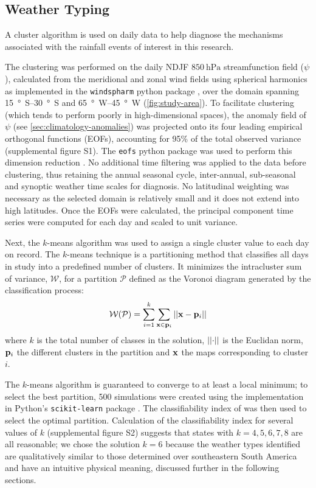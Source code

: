 \documentclass[twocol]{ametsoc}
\begin{document}
\subsection{Weather Typing}

A cluster algorithm is used on daily data to help diagnose the mechanisms associated with the rainfall events of interest in this research.

The clustering was performed on the daily NDJF $\SI{850}{\hecto\pascal}$ streamfunction field ($\psi$), calculated from the meridional and zonal wind fields using spherical harmonics as implemented in the \texttt{windspharm} python package \citep{Dawson:2016ws}, over the domain spanning \SIrange{15}{30}{\degree S} and \SIrange{65}{45}{\degree W} (\cref{fig:study-area}).
To facilitate clustering (which tends to perform poorly in high-dimensional spaces), the anomaly field of $\psi$ (see \cref{sec:climatology-anomalies}) was projected  onto its four leading empirical orthogonal functions (EOFs), accounting for 95\% of the total observed variance (supplemental figure S1).
The \texttt{eofs} python package was used to perform this dimension reduction \citep{Dawson:2016ge}.
No additional time filtering was applied to the data before clustering, thus retaining the annual seasonal cycle, inter-annual, sub-seasonal and synoptic weather time scales for diagnosis.
No latitudinal weighting was necessary as the selected domain is relatively small and it does not extend into high latitudes.
Once the EOFs were calculated, the principal component time series were computed for each day and scaled to unit variance.

Next, the $k$-means algorithm was used to assign a single cluster value to each day on record.
The $k$-means technique is a partitioning method that classifies all days in study into a predefined number of clusters.
It minimizes the intracluster sum of variance, $\mathcal{W}$, for a partition $\mathcal{P}$ defined as the Voronoi diagram generated by the classification process:
\begin{equation}
	\mathcal{W} \qty( \mathcal{P} ) = \sum_{i=1}^{k}\sum_{\vb{x} \in \vb{p}_{i}} \abs{\abs{\vb{x} - \vb{p}_i}}
\end{equation}
where $k$ is the total number of classes in the solution, $\abs{\abs{\cdot}}$ is the Euclidan norm, $\vb{p}_i$ the different clusters in the partition and $\vb{x}$ the maps corresponding to cluster $i$.

The $k$-means algorithm is guaranteed to converge to at least a local minimum; to select the best partition, 500 simulations were created using the implementation in Python's \texttt{scikit-learn} package \citep{Pedregosa:2012tv}.
The classifiability index of \citet{Michelangeli1995} was then used to select the optimal partition.
Calculation of the classifiability index for several values of $k$ (supplemental figure S2) suggests that states with $k=4,5,6,7,8$ are all reasonable; we chose the solution $k=6$ because the weather types identified are qualitatively similar to those determined over southeastern South America \citep{Munoz2015,Munoz2016} and have an intuitive physical meaning, discussed further in the following sections.
\end{document}

